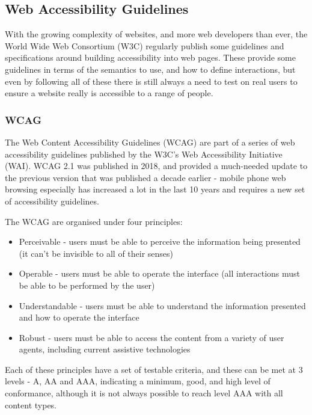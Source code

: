\documentclass[ %
                    author={Aleena Baig},
                supervisor={Dr Simon Lock},
                    degree={BSc},
                     title={On Making Web Accessible Graphs},
                  subtitle={},
                      year={2019} ]{dissertation}
\begin{document}

\subsection{Web Accessibility Guidelines}
With the growing complexity of websites, and more web developers than ever, the World Wide Web Consortium (W3C) regularly publish some guidelines and specifications around building accessibility into web pages.
These provide some guidelines in terms of the semantics to use, and how to define interactions, but even by following all of these there is still always a need to test on real users to ensure a website really is accessible to a range of people.

\subsubsection{WCAG}

The Web Content Accessibility Guidelines (WCAG) are part of a series of web accessibility guidelines published by the W3C's Web Accessibility Initiative (WAI). WCAG 2.1 was published in 2018, and provided a much-needed update to the previous version that was published a decade earlier - mobile phone web browsing especially has increased a lot in the last 10 years and requires a new set of accessibility guidelines.

The WCAG are organised under four principles:

\begin{itemize}
    \item Perceivable - users must be able to perceive the information being presented (it can't be invisible to all of their senses)
    \item Operable - users must be able to operate the interface (all interactions must be able to be performed by the user)
    \item Understandable - users must be able to understand the information presented and how to operate the interface
    \item Robust - users must be able to access the content from a variety of user agents, including current assistive technologies
\end{itemize}

Each of these principles have a set of testable criteria, and these can be met at 3 levels - A, AA and AAA, indicating a minimum, good, and high level of conformance, although it is not always possible to reach level AAA with all content types.
\end{document}
